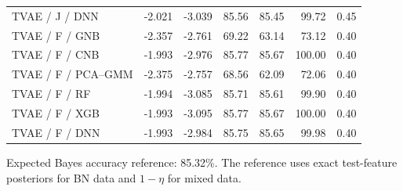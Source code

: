 \documentclass[11pt,letterpaper]{article}
\begin{document}
\begin{table}[H]
\begin{tabular}{lrrrrrr}
TVAE / J / DNN & -2.021 & -3.039 & 85.56 & 85.45 & 99.72 & 0.45\\
TVAE / F / GNB & -2.357 & -2.761 & 69.22 & 63.14 & 73.12 & 0.40\\
TVAE / F / CNB & -1.993 & -2.976 & 85.77 & 85.67 & 100.00 & 0.40\\
TVAE / F / PCA--GMM & -2.375 & -2.757 & 68.56 & 62.09 & 72.06 & 0.40\\
TVAE / F / RF & -1.994 & -3.085 & 85.71 & 85.61 & 99.90 & 0.40\\
TVAE / F / XGB & -1.993 & -3.095 & 85.77 & 85.67 & 100.00 & 0.40\\
TVAE / F / DNN & -1.993 & -2.984 & 85.75 & 85.65 & 99.98 & 0.40\\
\bottomrule\end{tabular}
\end{table}
Expected Bayes accuracy reference: 85.32\%. The reference uses exact test-feature posteriors for BN data and $1-\eta$ for mixed data.
\clearpage
\end{document}
